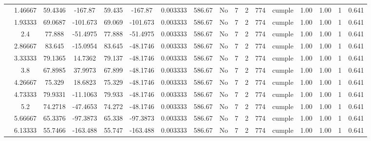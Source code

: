\begin{table}[H]
{\begin{tabular}{|c|c|c|c|c|c|c|c|c|c|c|c|c|c|c|c|c|}
\cline{2-17}        & 1.46667 & 59.4346 & -167.87 & 59.435 & -167.87 & 0.003333 & 586.67 & No  & 7   & 2   & 774 & \cellcolor[rgb]{ .776,  .937,  .808}cumple & 1.00 & 1.00 & 1   & 0.641 \bigstrut\\
\cline{2-17}        & 1.93333 & 69.0687 & -101.673 & 69.069 & -101.673 & 0.003333 & 586.67 & No  & 7   & 2   & 774 & \cellcolor[rgb]{ .776,  .937,  .808}cumple & 1.00 & 1.00 & 1   & 0.641 \bigstrut\\
\cline{2-17}        & 2.4 & 77.888 & -51.4975 & 77.888 & -51.4975 & 0.003333 & 586.67 & No  & 7   & 2   & 774 & \cellcolor[rgb]{ .776,  .937,  .808}cumple & 1.00 & 1.00 & 1   & 0.641 \bigstrut\\
\cline{2-17}        & 2.86667 & 83.645 & -15.0954 & 83.645 & -48.1746 & 0.003333 & 586.67 & No  & 7   & 2   & 774 & \cellcolor[rgb]{ .776,  .937,  .808}cumple & 1.00 & 1.00 & 1   & 0.641 \bigstrut\\
\cline{2-17}        & 3.33333 & 79.1365 & 14.7362 & 79.137 & -48.1746 & 0.003333 & 586.67 & No  & 7   & 2   & 774 & \cellcolor[rgb]{ .776,  .937,  .808}cumple & 1.00 & 1.00 & 1   & 0.641 \bigstrut\\
\cline{2-17}        & 3.8 & 67.8985 & 37.9973 & 67.899 & -48.1746 & 0.003333 & 586.67 & No  & 7   & 2   & 774 & \cellcolor[rgb]{ .776,  .937,  .808}cumple & 1.00 & 1.00 & 1   & 0.641 \bigstrut\\
\cline{2-17}        & 4.26667 & 75.329 & 18.6823 & 75.329 & -48.1746 & 0.003333 & 586.67 & No  & 7   & 2   & 774 & \cellcolor[rgb]{ .776,  .937,  .808}cumple & 1.00 & 1.00 & 1   & 0.641 \bigstrut\\
\cline{2-17}        & 4.73333 & 79.9331 & -11.1063 & 79.933 & -48.1746 & 0.003333 & 586.67 & No  & 7   & 2   & 774 & \cellcolor[rgb]{ .776,  .937,  .808}cumple & 1.00 & 1.00 & 1   & 0.641 \bigstrut\\
\cline{2-17}        & 5.2 & 74.2718 & -47.4653 & 74.272 & -48.1746 & 0.003333 & 586.67 & No  & 7   & 2   & 774 & \cellcolor[rgb]{ .776,  .937,  .808}cumple & 1.00 & 1.00 & 1   & 0.641 \bigstrut\\
\cline{2-17}        & 5.66667 & 65.3376 & -97.3873 & 65.338 & -97.3873 & 0.003333 & 586.67 & No  & 7   & 2   & 774 & \cellcolor[rgb]{ .776,  .937,  .808}cumple & 1.00 & 1.00 & 1   & 0.641 \bigstrut\\
\cline{2-17}        & 6.13333 & 55.7466 & -163.488 & 55.747 & -163.488 & 0.003333 & 586.67 & No  & 7   & 2   & 774 & \cellcolor[rgb]{ .776,  .937,  .808}cumple & 1.00 & 1.00 & 1   & 0.641 \bigstrut\\

\end{tabular}}
\end{table}
